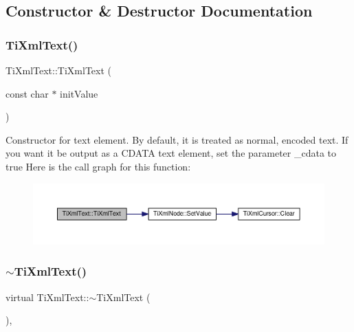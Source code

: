 \subsection{Constructor \& Destructor Documentation}
\mbox{\label{class_ti_xml_text_af659e77c6b87d684827f35a8f4895960}} 
\subsubsection{\texorpdfstring{Ti\+Xml\+Text()}{TiXmlText()}\hspace{0.1cm}{\footnotesize\ttfamily [1/2]}}
{\footnotesize\ttfamily Ti\+Xml\+Text\+::\+Ti\+Xml\+Text (\begin{DoxyParamCaption}\item[{const char $\ast$}]{init\+Value }\end{DoxyParamCaption})\hspace{0.3cm}{\ttfamily [inline]}}

Constructor for text element. By default, it is treated as normal, encoded text. If you want it be output as a C\+D\+A\+TA text element, set the parameter \+\_\+cdata to \textquotesingle{}true\textquotesingle{} Here is the call graph for this function\+:\nopagebreak
\begin{figure}[H]
\begin{center}
\leavevmode
\includegraphics[width=350pt]{class_ti_xml_text_af659e77c6b87d684827f35a8f4895960_cgraph}
\end{center}
\end{figure}
\mbox{\label{class_ti_xml_text_a829a4bd2d8d2461c333eb4f3f5b1b3d2}} 
\subsubsection{\texorpdfstring{$\sim$\+Ti\+Xml\+Text()}{~TiXmlText()}}
{\footnotesize\ttfamily virtual Ti\+Xml\+Text\+::$\sim$\+Ti\+Xml\+Text (\begin{DoxyParamCaption}{ }\end{DoxyParamCaption})\hspace{0.3cm}{\ttfamily [inline]}, {\ttfamily [virtual]}}

